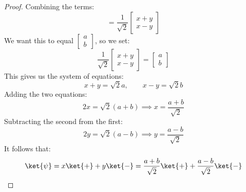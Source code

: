 \begin{examplebox}
\begin{proof}
        Combining the terms:
        \begin{equation*}
            = \frac{1}{\sqrt{2}}
            \begin{bmatrix}
                x + y \\ x - y
            \end{bmatrix}
        \end{equation*}
        We want this to equal $\begin{bmatrix}
            a \\ b
        \end{bmatrix}$, so we set:
        \begin{equation*}
            \frac{1}{\sqrt{2}}
            \begin{bmatrix}
                x + y \\ x - y
            \end{bmatrix}
            =
            \begin{bmatrix}
                a \\ b
            \end{bmatrix}
        \end{equation*}
        This gives us the system of equations:
        \begin{equation*}
            x + y = \sqrt{2} a,
            \qquad
            x - y = \sqrt{2} b
        \end{equation*}
        Adding the two equations:
        \begin{equation*}
            2x = \sqrt{2} (a + b) \implies x = \frac{a + b}{\sqrt{2}}
        \end{equation*}
        Subtracting the second from the first:
        \begin{equation*}
            2y = \sqrt{2} (a - b) \implies y = \frac{a - b}{\sqrt{2}}
        \end{equation*}
        It follows that:
        \begin{equation*}
            \ket{\psi}
            = x \ket{+} + y \ket{-}
            = \frac{a + b}{\sqrt{2}} \ket{+} + \frac{a - b}{\sqrt{2}} \ket{-}
        \end{equation*}
    \end{proof}
\end{examplebox}

